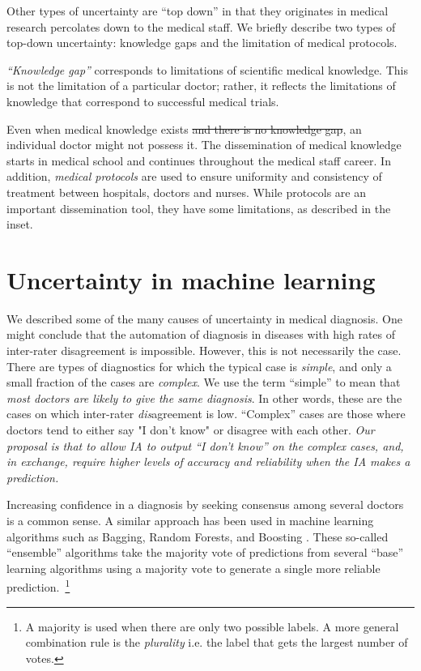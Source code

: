 \documentclass[11pt]{pnas-new}
\begin{document}
Other types of uncertainty are ``top down'' in that they originates in medical research percolates down to the medical staff. We briefly
describe two types of top-down uncertainty: knowledge gaps and the
limitation of medical protocols.

{\em ``Knowledge gap''} corresponds to limitations of scientific medical
knowledge. This is not the limitation of a particular doctor; rather,
it reflects the limitations of knowledge that correspond to successful
medical trials.


Even when medical knowledge exists \sout{\color{red}and there is no knowledge gap}, an individual doctor might not
possess  it. The dissemination of medical knowledge starts in medical
school and continues throughout the medical staff career. In addition,
{\em medical protocols} are used to ensure uniformity and
consistency of treatment between hospitals, doctors and nurses. While
protocols are an important dissemination tool, they have some limitations, 
as described in the inset.
~\\

\section{Uncertainty in machine learning}

We described some of the many causes of uncertainty in medical
diagnosis. One might conclude that the automation of diagnosis in
diseases with high rates of inter-rater disagreement is
impossible. However, this is not necessarily the case. There are types
of diagnostics for which the typical case is {\em simple}, and only a
small fraction of the cases are {\em complex}.  We use the term
``simple'' to mean that {\em most doctors are likely to give the same
  diagnosis}.  In other words, these are the cases on which
inter-rater {\em dis}agreement is low. ``Complex'' cases are those where
doctors tend to either say "I don't know" or disagree with each other.
{\em Our proposal is that to allow IA to output ``I don't know'' on
  the complex cases, and, in exchange, require higher levels of
  accuracy and reliability when the IA makes a prediction.}

Increasing confidence in a diagnosis by seeking consensus among
several doctors is a common sense. A similar approach has been
used in machine learning algorithms such as Bagging, Random Forests, and
Boosting \cite{}. These so-called ``ensemble'' algorithms take the
majority vote of predictions from several ``base'' learning algorithms using a majority
vote to generate a single more reliable prediction.~\footnote{A majority is
  used when there are only two possible labels. A more general
  combination rule is the {\em plurality} i.e. the label that gets the
  largest number of votes.}
\end{document}
